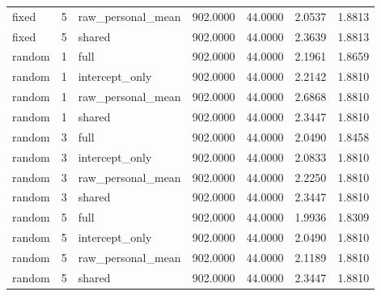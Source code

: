 {\begin{longtable}{lllllll}
fixed & 5 & raw\_personal\_mean & 902.0000 & 44.0000 & 2.0537 & 1.8813 \\
fixed & 5 & shared & 902.0000 & 44.0000 & 2.3639 & 1.8813 \\
random & 1 & full & 902.0000 & 44.0000 & 2.1961 & 1.8659 \\
random & 1 & intercept\_only & 902.0000 & 44.0000 & 2.2142 & 1.8810 \\
random & 1 & raw\_personal\_mean & 902.0000 & 44.0000 & 2.6868 & 1.8810 \\
random & 1 & shared & 902.0000 & 44.0000 & 2.3447 & 1.8810 \\
random & 3 & full & 902.0000 & 44.0000 & 2.0490 & 1.8458 \\
random & 3 & intercept\_only & 902.0000 & 44.0000 & 2.0833 & 1.8810 \\
random & 3 & raw\_personal\_mean & 902.0000 & 44.0000 & 2.2250 & 1.8810 \\
random & 3 & shared & 902.0000 & 44.0000 & 2.3447 & 1.8810 \\
random & 5 & full & 902.0000 & 44.0000 & 1.9936 & 1.8309 \\
random & 5 & intercept\_only & 902.0000 & 44.0000 & 2.0490 & 1.8810 \\
random & 5 & raw\_personal\_mean & 902.0000 & 44.0000 & 2.1189 & 1.8810 \\
random & 5 & shared & 902.0000 & 44.0000 & 2.3447 & 1.8810 \\
\bottomrule
\end{longtable}}
